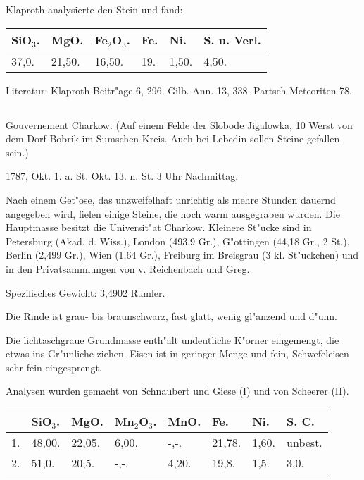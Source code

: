 \documentclass[a4paper, 11pt, oneside]{article}
\begin{document}
Klaproth analysierte den Stein und fand:
\begin{table}[!ht]
    \centering\swabfamily\Large
    \begin{tabular}{l l l l l l}
        SiO$_{3}$. & MgO. & Fe$_{2}$O$_{3}$. & Fe. & Ni. & S. u. Verl. \\ \hline
        37,0. & 21,50. & 16,50. & 19. & 1,50. & 4,50. \\
    \end{tabular}
\end{table}

\normalsize
Literatur: Klaproth Beitr"age 6, 296. Gilb. Ann. 13, 338. Partsch Meteoriten 78.
\subsection{}
\LARGE
\paragraph{}
Gouvernement Charkow. (Auf einem Felde der Slobode Jigalowka, 10 Werst von dem Dorf Bobrik im Sumschen Kreis. Auch bei Lebedin sollen Steine gefallen sein.)

1787, Okt. 1. a. St. Okt. 13. n. St. 3 Uhr Nachmittag.

Nach einem Get"ose, das unzweifelhaft unrichtig als mehre Stunden dauernd angegeben wird, fielen einige Steine, die noch warm ausgegraben wurden. Die Hauptmasse besitzt die Universit"at Charkow. Kleinere St"ucke sind in Petersburg (Akad. d. Wiss.), London (493,9 Gr.), G"ottingen (44,18 Gr., 2 St.), Berlin (2,499 Gr.), Wien (1,64 Gr.), Freiburg im Breisgrau (3 kl. St"uckchen) und in den Privatsammlungen von v. Reichenbach und Greg.

Spezifisches Gewicht: 3,4902 Rumler.

Die Rinde ist grau- bis braunschwarz, fast glatt, wenig gl"anzend und d"unn.

Die lichtaschgraue Grundmasse enth"alt undeutliche K"orner eingemengt, die etwas ins Gr"unliche ziehen. Eisen ist in geringer Menge und fein, Schwefeleisen sehr fein eingesprengt.

Analysen wurden gemacht von Schnaubert und Giese (I) und von Scheerer (II).
\begin{table}[!ht]
    \centering\swabfamily\Large
    \begin{tabular}{l l l l l l l l}
         & SiO$_{3}$. & MgO. & Mn$_{2}$O$_{3}$. & MnO. & Fe. & Ni. & S. C. \\ \hline
        1. & 48,00. & 22,05. & 6,00. & -,-. & 21,78. & 1,60. & unbest. \\
        2. & 51,0. & 20,5. & -,-. & 4,20. & 19,8. & 1,5. & 3,0. \\
    \end{tabular}
\end{table}
\end{document}
